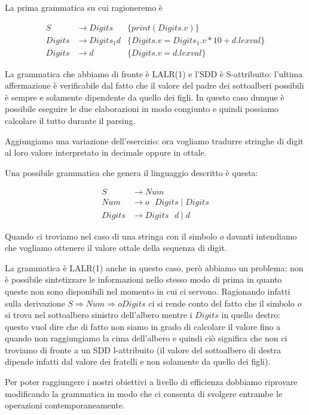 \documentclass[class=book, crop=false, oneside, 12pt]{standalone}
\begin{document}
La prima grammatica su cui ragioneremo è

\begin{align*}
    S &\to Digits	&\{print(Digits.v)\} \\
    Digits &\to Digits_1 d	&\{Digits.v = Digits_1.v * 10 + d.lexval\} \\
    Digits &\to d	&\{Digits.v = d.lexval\}
\end{align*}

La grammatica che abbiamo di fronte è LALR(1) e l'SDD è S-attribuito: l'ultima affermazione è verificabile dal fatto che il valore del padre dei sottoalberi possibili è sempre e solamente dipendente da quello dei figli. In questo caso dunque è possibile eseguire le due elaborazioni in modo congiunto e quindi possiamo calcolare il tutto durante il parsing. 

Aggiungiamo una variazione dell'esercizio: ora vogliamo tradurre stringhe di digit al loro valore interpretato in decimale oppure in ottale.

Una possibile grammatica che genera il linguaggio descritto è questa:

\begin{align*}
    S &\to Num \\
    Num &\to o \textrm{ } Digits \mid Digits \\
    Digits &\to Digits \textrm{ } d \mid d
\end{align*}

Quando ci troviamo nel caso di una stringa con il simbolo \(o\) davanti intendiamo che vogliamo ottenere il valore ottale della sequenza di digit. 

La grammatica è LALR(1) anche in questo caso, però abbiamo un problema: non è possibile sintetizzare le informazioni nello stesso modo di prima in quanto queste non sono disponibili nel momento in cui ci servono. Ragionando infatti sulla derivazione \(S \Rightarrow Num \Rightarrow o Digits\) ci si rende conto del fatto che il simbolo \(o\) si trova nel sottoalbero sinistro dell'albero mentre i \(Digits\) in quello destro: questo vuol dire che di fatto non siamo in grado di calcolare il valore fino a quando non raggiungiamo la cima dell'albero e quindi ciò significa che non ci troviamo di fronte a un SDD l-attribuito (il valore del sottoalbero di destra dipende infatti dal valore dei fratelli e non solamente da quello dei figli).

Per poter raggiungere i nostri obiettivi a livello di efficienza dobbiamo riprovare modificando la grammatica in modo che ci consenta di svolgere entrambe le operazioni contemporaneamente.
\end{document}
